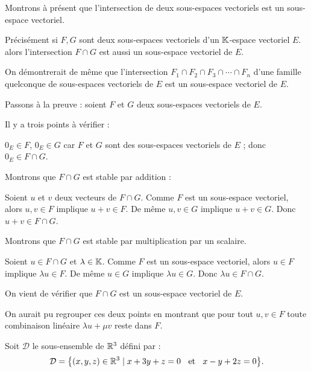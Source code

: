 \diapo

Montrons à présent que l'intersection de deux sous-espaces vectoriels est un sous-espace vectoriel.

Précisément si $F,G$ sont deux sous-espaces vectoriels d'un $\mathbb{K}$-espace vectoriel $E$.
alors l'intersection $F \cap G$ est aussi un sous-espace vectoriel de $E$.

\change

On démontrerait de même que l'intersection $F_1 \cap F_2 \cap F_3 \cap \cdots \cap F_n$ 
d'une famille quelconque de sous-espaces vectoriels de $E$ est un sous-espace 
vectoriel de $E$. 

\change

Passons à la preuve : soient $F$ et $G$ deux sous-espaces vectoriels de $E$. 

Il y a trois points à vérifier :

$0_E \in F$, $0_E\in G$ car $F$ et $G$ sont des sous-espaces vectoriels de $E$ ;
  donc $0_E \in F \cap G$.
  
\change

Montrons que $F \cap G$ est stable par addition :

Soient $u$ et $v$ deux vecteurs de  $F \cap G$.
Comme $F$ est un sous-espace vectoriel, alors $u,v \in F$ implique $u+v\in F$.
  De même $u,v \in G$ implique $u+v \in G$. Donc $u+v \in F \cap G$.
  
\change

Montrons que $F \cap G$ est stable par multiplication par un scalaire.


Soient $u \in F\cap G$ et $\lambda  \in \mathbb{K}$. 
Comme $F$ est un sous-espace vectoriel, 
  alors $u \in F$ implique $\lambda u \in F$. 
  De même $u \in G$ implique $\lambda u \in G$. 
  Donc $\lambda u \in F \cap G$.  

  
\change


On vient de vérifier que $F\cap G$ est un sous-espace vectoriel de $E$.

\change

On aurait pu regrouper ces deux points en montrant que
pour tout $u,v\in F$ toute combinaison linéaire $\lambda u + \mu v$ reste dans $F$.


\diapo


Soit $\mathcal{D}$ le sous-ensemble de $\mathbb{R}^3$ défini par :
$$\mathcal{D}= \big\{ (x,y,z) \in \mathbb{R}^3\mid x+3y+z =0 \;\; \text{ et } \;\; x-y+2z=0 \big\}.$$

